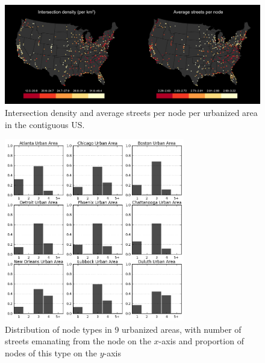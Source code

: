 \documentclass[11pt]{article}
\begin{document}
\begin{multicols}{2}
\begin{figure}[htbp]
	\centering
	\includegraphics[width=1\textwidth]{fig01.png}
	\caption{Intersection density and average streets per node per urbanized area in the contiguous US.}
	\label{fig:fig01}
\end{figure}

\begin{figure}[htbp]
	\centering
	\includegraphics[width=0.7\textwidth]{fig02.png}
	\caption{Distribution of node types in 9 urbanized areas, with number of streets emanating from the node on the $x$-axis and proportion of nodes of this type on the $y$-axis }
	\label{fig:fig02}
\end{figure}


\end{multicols}
\end{document}
